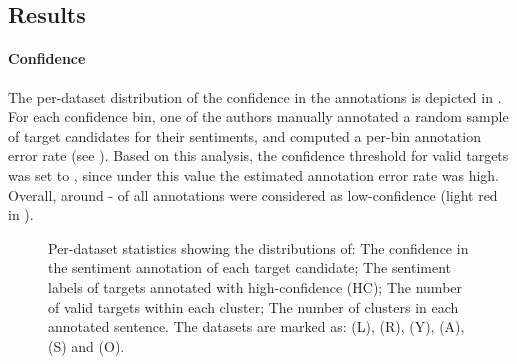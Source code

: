 \subsection{Results}

\paragraph{Confidence} The per-dataset distribution of the confidence in the annotations is depicted in .
For each confidence bin, one of the authors manually annotated a random sample of  target candidates for their sentiments, and computed a per-bin annotation error rate (see ). 
Based on this analysis, the 
confidence threshold for valid targets was set to \minConfidenceThreshold, since under this value the estimated annotation error rate was high. 
Overall, around - of all annotations were considered as low-confidence (light red in ). 

\newcommand{\figureWidth}[0]{0.46}
\newcommand{\topTrim}[0]{0cm}
\begin{figure*}[t]
    \centering
    \qquad
    
    \qquad
    \caption{Per-dataset statistics 
showing the distributions of: \protect{} The confidence in the sentiment annotation of each target candidate;
    \protect{} The sentiment labels of targets annotated with high-confidence (HC); 
    \protect{} The number of valid targets within each cluster;
    \protect{} The number of clusters in each annotated sentence. The datasets are marked as: \SeLapName (L),  \SeResName (R), \YelpName (Y), \AmazonName (A), \SstName (S) and \OpinosisName (O).
    }
     \label{fig:dataset_histograms}
\end{figure*}
 
